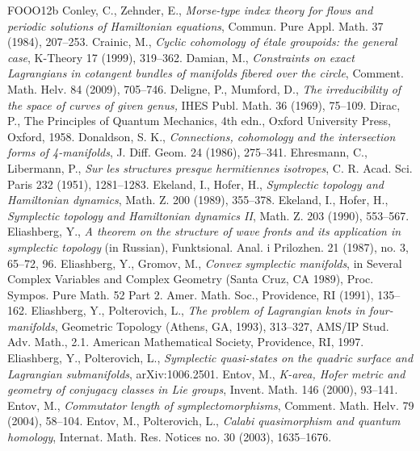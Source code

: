 \begin{thebibliography}{FOOO12b}
 Conley, C., Zehnder, E., \textit{Morse-type index theory for flows and periodic solutions of Hamiltonian equations}, Commun. Pure Appl. Math. 37 (1984), 207--253.
 Crainic, M., \textit{Cyclic cohomology of étale groupoids: the general case}, K-Theory 17 (1999), 319--362.
 Damian, M., \textit{Constraints on exact Lagrangians in cotangent bundles of manifolds fibered over the circle}, Comment. Math. Helv. 84 (2009), 705--746.
 Deligne, P., Mumford, D., \textit{The irreducibility of the space of curves of given genus,} IHES Publ. Math. 36 (1969), 75--109.
 Dirac, P., The Principles of Quantum Mechanics, 4th edn., Oxford University Press, Oxford, 1958.
 Donaldson, S. K., \textit{Connections, cohomology and the intersection forms of 4-manifolds}, J. Diff. Geom. 24 (1986), 275--341.
 Ehresmann, C., Libermann, P., \textit{Sur les structures presque hermitiennes isotropes}, C. R. Acad. Sci. Paris 232 (1951), 1281--1283.
 Ekeland, I., Hofer, H., \textit{Symplectic topology and Hamiltonian dynamics}, Math. Z. 200 (1989), 355--378.
 Ekeland, I., Hofer, H., \textit{Symplectic topology and Hamiltonian dynamics II}, Math. Z. 203 (1990), 553--567.
 Eliashberg, Y., \textit{A theorem on the structure of wave fronts and its application in symplectic topology} (in Russian), Funktsional. Anal. i Prilozhen. 21 (1987), no. 3, 65--72, 96.
 Eliashberg, Y., Gromov, M., \textit{Convex symplectic manifolds}, in Several Complex Variables and Complex Geometry (Santa Cruz, CA 1989), Proc. Sympos. Pure Math. 52 Part 2. Amer. Math. Soc., Providence, RI (1991), 135--162.
 Eliashberg, Y., Polterovich, L., \textit{The problem of Lagrangian knots in four-manifolds}, Geometric Topology (Athens, GA, 1993), 313--327, AMS/IP Stud. Adv. Math., 2.1. American Mathematical Society, Providence, RI, 1997.
 Eliashberg, Y., Polterovich, L., \textit{Symplectic quasi-states on the quadric surface and Lagrangian submanifolds}, arXiv:1006.2501.
 Entov, M., \textit{K-area, Hofer metric and geometry of conjugacy classes in Lie groups}, Invent. Math. 146 (2000), 93--141.
 Entov, M., \textit{Commutator length of symplectomorphisms}, Comment. Math. Helv. 79 (2004), 58--104.
 Entov, M., Polterovich, L., \textit{Calabi quasimorphism and quantum homology}, Internat. Math. Res. Notices no. 30 (2003), 1635--1676.

\end{thebibliography}
